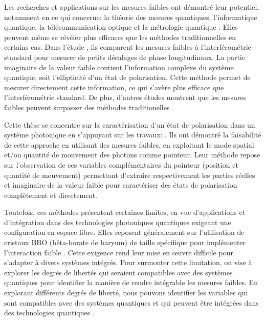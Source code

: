 \begin{onehalfspace}
    
    Les recherches et applications sur les mesures faibles ont démontré 
    leur potentiel, notamment en ce qui concerne: la théorie des mesures quantiques, 
    l’informatique quantique, la télécommunication optique et la métrologie quantique
    \cite{Huang:22,SpinHallEffect,Lundeen_Resch,QED,OpticalNetworks,Lundeen_thesis,Brunner_2004}. 
    Elles peuvent même se révéler plus efficaces que les méthodes 
    traditionnelles en certains cas. Dans l'étude \cite{WeakorStd}, ils 
    comparent les mesures faibles à l'interférométrie standard pour 
    mesurer de petits décalages de phase longitudinaux. La partie 
    imaginaire de la valeur faible contient l'information complexe du 
    système quantique, soit l'ellipticité d'un état de polarisation. 
    Cette méthode permet de mesurer directement cette information, ce 
    qui s’avère plus efficace que l'interférométrie standard. De plus, 
    d’autres études montrent que les mesures faibles peuvent surpasser 
    des méthodes traditionelles \cite{Magaña-Loaiza_2017,Jeff_outperform}. 

    \noindent Cette thèse se concentre sur la caractérisation d’un état 
    de polarisation dans un système photonique en s’appuyant sur les 
    travaux: \cite{Lundeen_Direct_Measurement,Lundeen_Bamber,Hairiri,Guilleaum}. 
    Ils ont démontré la faisabilité de cette approche en utilisant des 
    mesures faibles, en exploitant le mode spatial et/ou quantité de 
    mouvement des photons comme pointeur. Leur méthode repose sur 
    l'observation de ces variables complémentaires du pointeur (position 
    et quantité de mouvement) permettant d'extraire respectivement les 
    parties réelles et imaginaire de la valeur faible pour caractériser 
    des états de polarisation complètement et directement.
    
    \noindent Toutefois, ces méthodes présentent certaines limites, 
    en vue d'applications et d'intégration dans des technologies photoniques 
    quantiques exigeant une configuration en espace libre. Elles reposent 
    généralement sur l’utilisation de cristaux BBO (bêta-borate de baryum) de 
    taille spécifique pour implémenter l’interaction faible 
    \cite{Hairiri,Guilleaum,Guilleaum_thesis}. Cette exigence rend leur 
    mise en œuvre difficile pour s’adapter à divers systèmes intégrés. 
    Pour surmonter cette limitation, 
    on vise à explorer les degrés de libertés 
    qui seraient compatibles avec 
    des systèmes quantiques pour identifier la manière de rendre 
    intégrable les mesures faibles. En explorant différents degrés de liberté,
    nous pouvons identifier les variables qui sont compatibles avec
    des systèmes quantiques et qui peuvent être intégrées dans des
    technologies quantiques \cite{kaneda2018highefficiencysinglephotongenerationlargescale,Dai_2020}. 


\end{onehalfspace}
